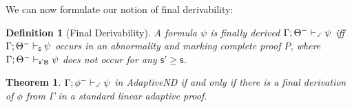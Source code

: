 \documentclass[]{article}
\newtheorem{definition}{Definition}
\newtheorem{theorem}{Theorem}
\newcommand{\Turn}[2]
    { {#1}\vdash_{\textbf{\sf s}}  {#2}}
\newcommand{\TurnChecked}[2]
    { {#1}\vdash_{\textbf{\sf \checked}}  {#2}}
\newcommand{\TurnMarkedprime}[2]
    { {#1}\vdash_{\textbf{\sf s'\XBox}}  {#2}}
\begin{document}
We can now formulate our notion of final derivability:

\begin{definition}[Final Derivability]\label{def:finalder}
A formula $\psi$ is finally derived $\TurnChecked{\Gamma;\Theta^{-}}{\psi}$ iff $\Turn{\Gamma; \Theta^-}{\psi}$ occurs in an abnormality and marking complete proof $P$, where $\TurnMarkedprime{\Gamma; \Theta^-}{\psi}$ does not occur for any $\mathsf{s'} \geq \mathsf{s}$.
\end{definition}
%



\begin{theorem}
$\TurnChecked{\Gamma;\phi^{-}}{\psi}$ in {\sf AdaptiveND} if and only if there is a final derivation of $\phi$ from $\Gamma$ in a standard linear adaptive proof.
\end{theorem}
\end{document}
